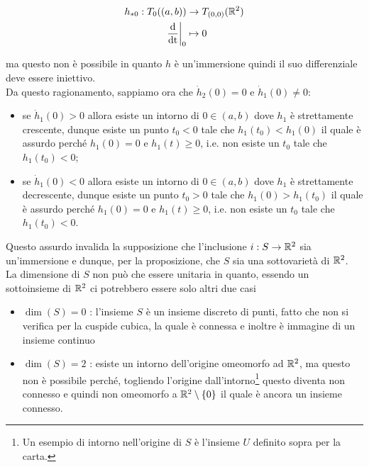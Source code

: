 \begin{align}
	\begin{split}
		h_{*0} : T_{0}((a,b)) &\to T_{(0,0)}(\mathbb{R}^{2})\\
		\left. \dfrac{\operatorname{d}}{\operatorname{dt}} \right|_{0} &\mapsto 0
	\end{split}
\end{align}

ma questo non è possibile in quanto $ h $ è un'immersione quindi il suo differenziale deve essere iniettivo.\\
Da questo ragionamento, sappiamo ora che $ \dot{h}_{2}(0)=0 $ e $ \dot{h}_{1}(0) \neq 0 $:

\begin{itemize}
	\item se $ \dot{h}_{1}(0) > 0 $ allora esiste un intorno di $ 0 \in (a,b) $ dove $ h_{1} $ è strettamente crescente, dunque esiste un punto $ t_{0}<0 $ tale che $ h_{1}(t_{0}) < h_{1}(0) $ il quale è assurdo perché $ h_{1}(0) = 0 $ e $ h_{1}(t) \geqslant 0 $, i.e. non esiste un $ t_{0} $ tale che $ h_{1}(t_{0}) < 0 $;
	
	\item se $ \dot{h}_{1}(0) < 0 $ allora esiste un intorno di $ 0 \in (a,b) $ dove $ h_{1} $ è strettamente decrescente, dunque esiste un punto $ t_{0}>0 $ tale che $ h_{1}(0) > h_{1}(t_{0}) $ il quale è assurdo perché $ h_{1}(0) = 0 $ e $ h_{1}(t) \geqslant 0 $, i.e. non esiste un $ t_{0} $ tale che $ h_{1}(t_{0}) < 0 $.
\end{itemize}

Questo assurdo invalida la supposizione che l'inclusione $ i : S \to \mathbb{R}^{2} $ sia un'immersione e dunque, per la proposizione, che $ S $ sia una sottovarietà di $ \mathbb{R}^{2} $.\\
La dimensione di $ S $ non può che essere unitaria in quanto, essendo un sottoinsieme di $ \mathbb{R}^{2} $ ci potrebbero essere solo altri due casi

\begin{itemize}
	\item $ \dim(S)=0 $ : l'insieme $ S $ è un insieme discreto di punti, fatto che non si verifica per la cuspide cubica, la quale è connessa e inoltre è immagine di un insieme continuo
	
	\item $ \dim(S)=2 $ : esiste un intorno dell'origine omeomorfo ad $ \mathbb{R}^{2} $, ma questo non è possibile perché, togliendo l'origine dall'intorno\footnote{%
		Un esempio di intorno nell'origine di $ S $ è l'insieme $ U $ definito sopra per la carta.%
	} questo diventa non connesso e quindi non omeomorfo a $ \mathbb{R}^{2} \setminus \{0\} $ il quale è ancora un insieme connesso.
\end{itemize}


